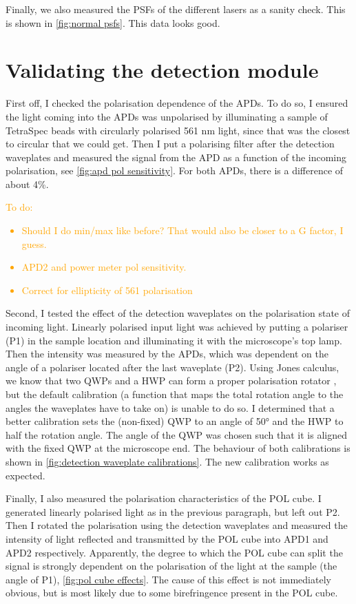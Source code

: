 Finally, we also measured the PSFs of the different lasers as a sanity check. This is shown in \autoref{fig:normal psfs}. This data looks good.  

\section{Validating the detection module}

First off, I checked the polarisation dependence of the APDs. To do so, I ensured the light coming into the APDs was unpolarised by illuminating a sample of TetraSpec beads with circularly polarised 561 nm light, since that was the closest to circular that we could get. Then I put a polarising filter after the detection waveplates and measured the signal from the APD as a function of the incoming polarisation, see \autoref{fig:apd pol sensitivity}. For both APDs, there is a difference of about 4\%.

\textcolor{orange}{
To do:
	\begin{itemize}
		\item Should I do min/max like before? That would also be closer to a G factor, I guess.
		\item APD2 and power meter pol sensitivity.
		\item Correct for ellipticity of 561 polarisation
	\end{itemize}
} 

Second, I tested the effect of the detection waveplates on the polarisation state of incoming light. Linearly polarised input light was achieved by putting a polariser (P1) in the sample location and illuminating it with the microscope's top lamp. Then the intensity was measured by the APDs, which was dependent on the angle of a polariser located after the last waveplate (P2). Using Jones calculus, we know that two QWPs and a HWP can form a proper polarisation rotator , but the default calibration (a function that maps the total rotation angle to the angles the waveplates have to take on) is unable to do so. I determined that a better calibration sets the (non-fixed) QWP to an angle of 50° and the HWP to half the rotation angle. The angle of the QWP was chosen such that it is aligned with the fixed QWP at the microscope end. The behaviour of both calibrations is shown in \autoref{fig:detection waveplate calibrations}. The new calibration works as expected.


Finally, I also measured the polarisation characteristics of the POL cube. I generated linearly polarised light as in the previous paragraph, but left out P2. Then I rotated the polarisation using the detection waveplates and measured the intensity of light reflected and transmitted by the POL cube into APD1 and APD2 respectively. Apparently, the degree to which the POL cube can split the signal is strongly dependent on the polarisation of the light at the sample (the angle of P1), \autoref{fig:pol cube effects}. The cause of this effect is not immediately obvious, but is most likely due to some birefringence present in the POL cube. 

